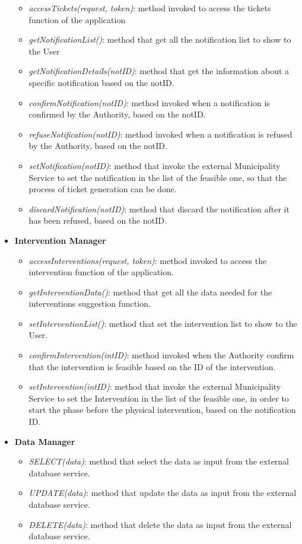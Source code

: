\documentclass{article}
\begin{document}
\begin{itemize}
\begin{itemize}
        		\item {\it accessTickets(request, token)}: method invoked to access the tickets function of the application
        		\item {\it getNotificationList()}: method that get all the notification list to show to the User
        		\item {\it getNotificationDetails(notID)}: method that get the information about a specific notification based on the notID.
        		\item {\it confirmNotification(notID)}: method invoked when a notification is confirmed by the Authority, based on the notID.
        		\item {\it refuseNotification(notID)}: method invoked when a notification is refused by the Authority, based on the notID.
        		\item {\it setNotification(notID)}: method that invoke the external Municipality Service to set the notification in the list of the feasible one, so that the process of ticket generation can be done.
        		\item {\it discardNotification(notID)}: method that discard the notification after it has been refused, based on the notID.
    		\end{itemize}
    	\item {\bf Intervention Manager}
    		\begin{itemize}
        		\item {\it accessInterventions(request, token)}: method invoked to access the intervention function of the application.
        		\item {\it getInterventionData()}: method that get all the data needed for the interventions suggestion function.
        		\item {\it setInterventionList()}: method that set the intervention list to show to the User. 
        		\item {\it confirmIntervention(intID)}: method invoked when the Authority confirm that the intervention is feasible based on the ID of the intervention.
        		\item {\it setIntervention(intID)}: method that invoke the external Municipality Service to set the Intervention in the list of the feasible one, in order to start the phase before the physical intervention, based on the notification ID.  
    		\end{itemize}
    	\item {\bf Data Manager}
    		\begin{itemize}
        		\item {\it SELECT(data)}: method that select the data as input from the external database service.
        		\item {\it UPDATE(data)}: method that update the data as input from the external database service.
        		\item {\it DELETE(data)}: method that delete the data as input from the external database service.
    		\end{itemize}
	\end{itemize}
	
\end{document}
